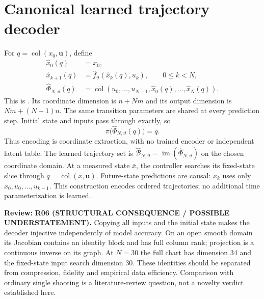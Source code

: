\documentclass[11pt]{article}
\newcommand{\col}{\operatorname{col}}
\newcommand{\review}[1]{\par\noindent\textcolor{red!70!black}{\textbf{Review:} #1}\par}
\newcommand{\code}[1]{\texttt{\detokenize{#1}}}
\begin{document}
\section{Canonical learned trajectory decoder}
For $q=\col(x_0,\mathbf u)$, define
\begin{align}
\widehat x_0(q)&=x_0,\label{eq:initial}\\
\widehat x_{k+1}(q)&=\widehat f_\vartheta(\widehat x_k(q),u_k),\qquad 0\leq k<N,\label{eq:rollout}\\
\widehat\Phi_{N,\vartheta}(q)&=\col(u_0,\ldots,u_{N-1},\widehat x_0(q),\ldots,\widehat x_N(q)).\label{eq:decoder}
\end{align}
This is \code{CanonicalBehaviorDecoder}. Its coordinate dimension is $n+Nm$ and its output dimension is $Nm+(N+1)n$. The same transition parameters are shared at every prediction step. Initial state and inputs pass through exactly, so
\begin{equation}\label{eq:projection}
\pi\bigl(\widehat\Phi_{N,\vartheta}(q)\bigr)=q.
\end{equation}
Thus encoding is coordinate extraction, with no trained encoder or independent latent table. The learned trajectory set is $\widehat{\mathcal B}_{N,\vartheta}^+=\operatorname{im}(\widehat\Phi_{N,\vartheta})$ on the chosen coordinate domain. At a measured state $\bar x$, the controller searches its fixed-state slice through $q=\col(\bar x,\mathbf u)$. Future-state predictions are causal: $\widehat x_k$ uses only $x_0,u_0,\ldots,u_{k-1}$. This construction encodes ordered trajectories; no additional time parameterization is learned.
\review{\textbf{R06 (STRUCTURAL CONSEQUENCE / POSSIBLE UNDERSTATEMENT).} Copying all inputs and the initial state makes the decoder injective independently of model accuracy. On an open smooth domain its Jacobian contains an identity block and has full column rank; projection is a continuous inverse on its graph. At $N=30$ the full chart has dimension 34 and the fixed-state input search dimension 30. These identities should be separated from compression, fidelity and empirical data efficiency. Comparison with ordinary single shooting is a literature-review question, not a novelty verdict established here.}
\end{document}
